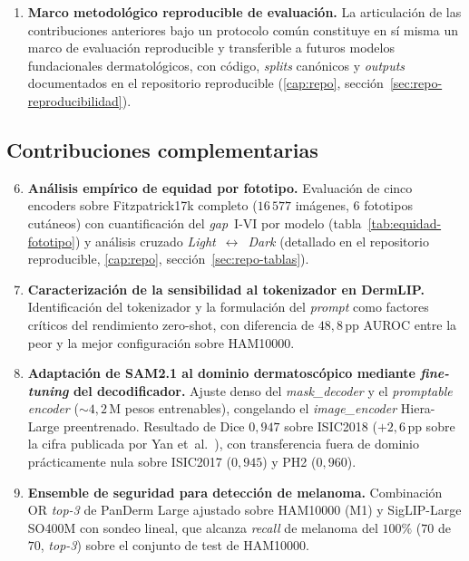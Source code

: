 \begin{enumerate}
\item \textbf{Marco metodológico reproducible de evaluación.} La
articulación de las contribuciones anteriores bajo un protocolo común
constituye en sí misma un marco de evaluación reproducible y transferible
a futuros modelos fundacionales dermatológicos, con código, \emph{splits}
canónicos y \emph{outputs} documentados en el repositorio reproducible
(\ref{cap:repo}, sección~\ref{sec:repo-reproducibilidad}).
\end{enumerate}

\subsection{Contribuciones complementarias}
\label{sec:contrib-anexos}

\begin{enumerate}
\setcounter{enumi}{5}
\item \textbf{Análisis empírico de equidad por fototipo.}
Evaluación de cinco encoders sobre Fitzpatrick17k completo
($16\,577$ imágenes, $6$ fototipos cutáneos) con
cuantificación del \emph{gap}~I-VI por modelo
(tabla~\ref{tab:equidad-fototipo}) y análisis cruzado
\emph{Light}~$\leftrightarrow$~\emph{Dark}
(detallado en el repositorio reproducible, \ref{cap:repo}, sección~\ref{sec:repo-tablas}).

\item \textbf{Caracterización de la sensibilidad al tokenizador en
DermLIP.} Identificación del tokenizador y la formulación del
\emph{prompt} como factores críticos del rendimiento zero-shot,
con diferencia de $48{,}8$\,pp AUROC entre la peor y la mejor
configuración sobre HAM10000.

\item \textbf{Adaptación de SAM2.1 al dominio dermatoscópico
mediante \emph{fine-tuning} del decodificador.} Ajuste denso del
\emph{mask\_decoder} y el \emph{promptable encoder} ($\sim 4{,}2$\,M
pesos entrenables), congelando el
\emph{image\_encoder} Hiera-Large preentrenado. Resultado de Dice
$0{,}947$ sobre ISIC2018 ($+2{,}6$\,pp sobre la cifra
publicada por Yan et~al.~\cite{panderm2025}), con transferencia
fuera de dominio prácticamente nula sobre ISIC2017 ($0{,}945$)
y PH2 ($0{,}960$).

\item \textbf{Ensemble de seguridad para detección de melanoma.}
Combinación OR \emph{top-3} de PanDerm Large ajustado sobre
HAM10000 (M1) y SigLIP-Large SO400M con sondeo lineal, que alcanza
\emph{recall} de melanoma del $100\%$
($70$ de $70$, \emph{top-3}) sobre el conjunto de test de
HAM10000.


\end{enumerate}

